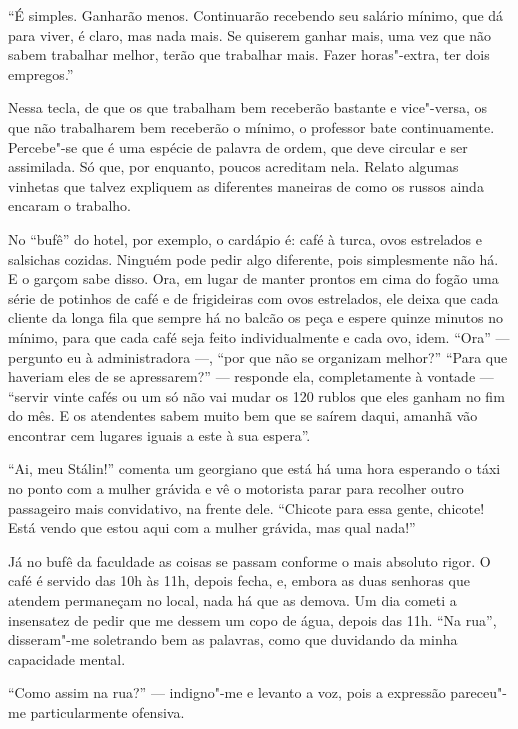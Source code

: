 ``É simples. Ganharão menos. Continuarão recebendo seu salário mínimo,
que dá para viver, é claro, mas nada mais. Se quiserem ganhar mais, uma
vez que não sabem trabalhar melhor, terão que trabalhar mais. Fazer
horas"-extra, ter dois empregos.''

Nessa tecla, de que os que trabalham bem receberão bastante e
vice"-versa, os que não trabalharem bem receberão o mínimo, o professor
bate continuamente. Percebe"-se que é uma espécie de palavra de ordem,
que deve circular e ser assimilada. Só que, por enquanto, poucos
acreditam nela. Relato algumas vinhetas que talvez expliquem as
diferentes maneiras de como os russos ainda encaram o trabalho.

No ``bufê'' do hotel, por exemplo, o cardápio é: café à turca, ovos
estrelados e salsichas cozidas. Ninguém pode pedir algo diferente, pois
simplesmente não há. E o garçom sabe disso. Ora, em lugar de manter
prontos em cima do fogão uma série de potinhos de café e de frigideiras
com ovos estrelados, ele deixa que cada cliente da longa fila que sempre
há no balcão os peça e espere quinze minutos no mínimo, para que cada
café seja feito individualmente e cada ovo, idem. ``Ora'' --- pergunto eu à
administradora ---, ``por que não se organizam melhor?'' ``Para que haveriam
eles de se apressarem?'' --- responde ela, completamente à vontade --- ``servir
vinte cafés ou um só não vai mudar os 120 rublos que eles ganham no fim
do mês. E os atendentes sabem muito bem que se saírem daqui, amanhã vão
encontrar cem lugares iguais a este à sua espera''.

``Ai, meu Stálin!'' comenta um georgiano que está há uma hora esperando
o táxi no ponto com a mulher grávida e vê o motorista parar para
recolher outro passageiro mais convidativo, na frente dele. ``Chicote
para essa gente, chicote! Está vendo que estou aqui com a mulher
grávida, mas qual nada!''

Já no bufê da faculdade as coisas se passam conforme o mais absoluto
rigor. O café é servido das 10h às 11h, depois fecha, e, embora as duas
senhoras que atendem permaneçam no local, nada há que as demova. Um dia
cometi a insensatez de pedir que me dessem um copo de água, depois das
11h. ``Na rua'', disseram"-me soletrando bem as palavras, como que
duvidando da minha capacidade mental.

``Como assim na rua?'' --- indigno"-me e levanto a voz, pois a expressão
pareceu"-me particularmente ofensiva.

